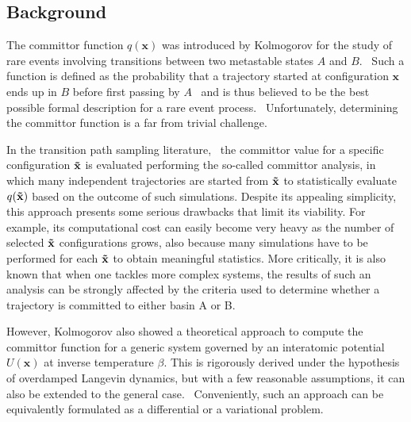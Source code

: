 \subsection{Background}
    \label{sec:background}
        The committor function $q(\textbf{x})$ was introduced by Kolmogorov for the study of rare events involving transitions between two metastable states $A$ and $B$.~\cite{kolmogoroff1931analytischen}
        Such a function is defined as the probability that a trajectory started at configuration $\textbf{x}$ ends up in $B$ before first passing by $A$~\cite{weinan2010transition} and is thus believed to be the best possible formal description for a rare event process.~\cite{berezhkovskii2005one,li2014recent,ma2005automatic,he2022committor}
        Unfortunately, determining the committor function is a far from trivial challenge.
    
        In the transition path sampling literature,~\cite{Dellago2006, jung2023machine, bolhuis2002throwing} the committor value for a specific configuration $\textbf{\tilde{x}}$ is evaluated performing the so-called committor analysis, in which many independent trajectories are started from $\textbf{\tilde{x}}$ to statistically evaluate $q(\textbf{\tilde{x}})$ based on the outcome of such simulations. 
        Despite its appealing simplicity, this approach presents some serious drawbacks that limit its viability. 
        For example, its computational cost can easily become very heavy as the number of selected $\textbf{\tilde{x}}$ configurations grows, also because many simulations have to be performed for each $\textbf{\tilde{x}}$ to obtain meaningful statistics.
        More critically, it is also known that when one tackles more complex systems, the results of such an analysis can be strongly affected by the criteria used to determine whether a trajectory is committed to either basin A or B.~\cite{lazzeri2023committor}

        However, Kolmogorov also showed a theoretical approach to compute the committor function for a generic system governed by an interatomic potential $U(\textbf{x})$ at inverse temperature $\beta$. This is rigorously derived under the hypothesis of overdamped Langevin dynamics, but with a few reasonable assumptions, it can also be extended to the general case.~\cite{weinan2010transition}
        Conveniently, such an approach can be equivalently formulated as a differential or a variational problem.

